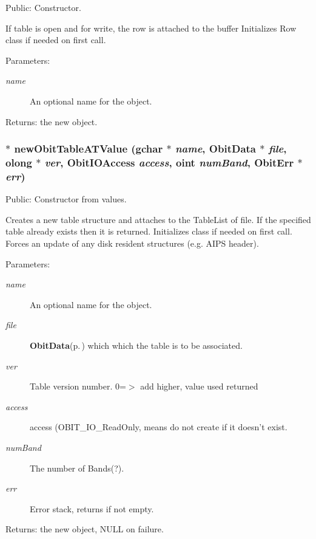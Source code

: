 Public: Constructor. 

If table is open and for write, the row is attached to the buffer Initializes Row class if needed on first call. \begin{Desc}
\item[Parameters:]
\begin{description}
\item[{\em name}]An optional name for the object. \end{description}
\end{Desc}
\begin{Desc}
\item[Returns:]the new object. \end{Desc}
\subsubsection{$\ast$ new\-Obit\-Table\-ATValue (gchar $\ast$ {\em name}, {\bf Obit\-Data} $\ast$ {\em file}, {\bf olong} $\ast$ {\em ver}, Obit\-IOAccess {\em access}, {\bf oint} {\em num\-Band}, {\bf Obit\-Err} $\ast$ {\em err})}\label{ObitTableAT_8h_a12}


Public: Constructor from values. 

Creates a new table structure and attaches to the Table\-List of file. If the specified table already exists then it is returned. Initializes class if needed on first call. Forces an update of any disk resident structures (e.g. AIPS header). \begin{Desc}
\item[Parameters:]
\begin{description}
\item[{\em name}]An optional name for the object. \item[{\em file}]{\bf Obit\-Data}{\rm (p.\,\pageref{structObitData})} which which the table is to be associated. \item[{\em ver}]Table version number. 0=$>$ add higher, value used returned \item[{\em access}]access (OBIT\_\-IO\_\-Read\-Only, means do not create if it doesn't exist. \item[{\em num\-Band}]The number of Bands(?). \item[{\em err}]Error stack, returns if not empty. \end{description}
\end{Desc}
\begin{Desc}
\item[Returns:]the new object, NULL on failure. \end{Desc}
